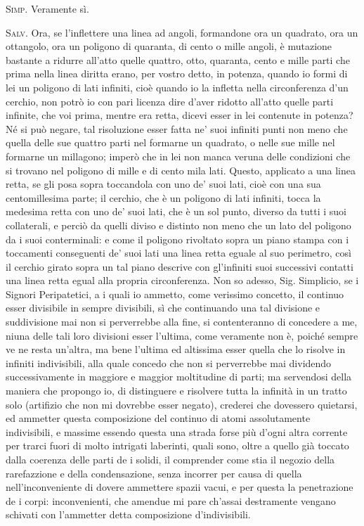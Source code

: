 \documentclass[11pt,twoside,openany]{book}
\newcommand{\speaker}[1]{\textcolor{rubric}{\textsc{#1}}\space}
\begin{document}
\speaker{Simp.} Veramente sì.

\speaker{Salv.} Ora, se l'inflettere una linea ad angoli, formandone ora un quadrato, ora un ottangolo, ora un poligono di quaranta, di cento o mille angoli, è mutazione bastante a ridurre all'atto quelle quattro, otto, quaranta, cento e mille parti che prima nella linea diritta erano, per vostro detto, in potenza, quando io formi di lei un poligono di lati infiniti, cioè quando io la infletta nella circonferenza d'un cerchio, non potrò io con pari licenza dire d'aver ridotto all'atto quelle parti infinite, che voi prima, mentre era retta, dicevi esser in lei contenute in potenza? Né si può negare, tal risoluzione esser fatta ne' suoi infiniti punti non meno che quella delle sue quattro parti nel formarne un quadrato, o nelle sue mille nel formarne un millagono; imperò che in lei non manca veruna delle condizioni che si trovano nel poligono di mille e di cento mila lati. Questo, applicato a una linea retta, se gli posa sopra toccandola con uno de' suoi lati, cioè con una sua centomillesima parte; il cerchio, che è un poligono di lati infiniti, tocca la medesima retta con uno de' suoi lati, che è un sol punto, diverso da tutti i suoi collaterali, e perciò da quelli diviso e distinto non meno che un lato del poligono da i suoi conterminali: e come il poligono rivoltato sopra un piano stampa con i toccamenti conseguenti de' suoi lati una linea retta eguale al suo perimetro, così il cerchio girato sopra un tal piano descrive con gl'infiniti suoi successivi contatti una linea retta egual alla propria circonferenza. Non so adesso, Sig. Simplicio, se i Signori Peripatetici, a i quali io ammetto, come verissimo concetto, il continuo esser divisibile in sempre divisibili, sì che continuando una tal divisione e suddivisione mai non si perverrebbe alla fine, si contenteranno di concedere a me, niuna delle tali loro divisioni esser l'ultima, come veramente non è, poiché sempre ve ne resta un'altra, ma bene l'ultima ed altissima esser quella che lo risolve in infiniti indivisibili, alla quale concedo che non si perverrebbe mai dividendo successivamente in maggiore e maggior moltitudine di parti; ma servendosi della maniera che propongo io, di distinguere e risolvere tutta la infinità in un tratto solo (artifizio che non mi dovrebbe esser negato), crederei che dovessero quietarsi, ed ammetter questa composizione del continuo di atomi assolutamente indivisibili, e massime essendo questa una strada forse più d'ogni altra corrente per trarci fuori di molto intrigati laberinti, quali sono, oltre a quello già toccato dalla coerenza delle parti de i solidi, il comprender come stia il negozio della rarefazzione e della condensazione, senza incorrer per causa di quella nell'inconveniente di dovere ammettere spazii vacui, e per questa la penetrazione de i corpi: inconvenienti, che amendue mi pare ch'assai destramente vengano schivati con l'ammetter detta composizione d'indivisibili.
\end{document}
